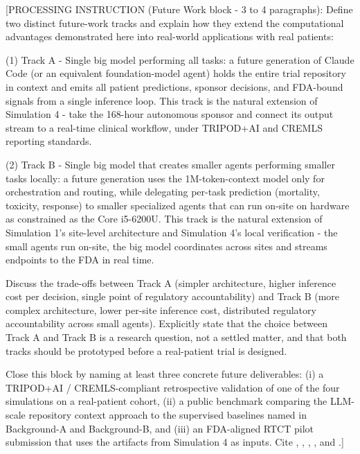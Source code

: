 [PROCESSING INSTRUCTION (Future Work block - 3 to 4 paragraphs): Define
two distinct future-work tracks and explain how they extend the
computational advantages demonstrated here into real-world applications
with real patients:

(1) Track A - Single big model performing all tasks: a future generation
of Claude Code (or an equivalent foundation-model agent) holds the entire
trial repository in context and emits all patient predictions, sponsor
decisions, and FDA-bound signals from a single inference loop. This track
is the natural extension of Simulation 4 - take the 168-hour autonomous
sponsor and connect its output stream to a real-time clinical workflow,
under TRIPOD+AI and CREMLS reporting standards.

(2) Track B - Single big model that creates smaller agents performing
smaller tasks locally: a future generation uses the 1M-token-context
model only for orchestration and routing, while delegating per-task
prediction (mortality, toxicity, response) to smaller specialized agents
that can run on-site on hardware as constrained as the Core i5-6200U.
This track is the natural extension of Simulation 1's site-level
architecture and Simulation 4's local verification - the small agents
run on-site, the big model coordinates across sites and streams
endpoints to the FDA in real time.

Discuss the trade-offs between Track A (simpler architecture, higher
inference cost per decision, single point of regulatory accountability)
and Track B (more complex architecture, lower per-site inference cost,
distributed regulatory accountability across small agents). Explicitly
state that the choice between Track A and Track B is a research question,
not a settled matter, and that both tracks should be prototyped before a
real-patient trial is designed.

Close this block by naming at least three concrete future deliverables:
(i) a TRIPOD+AI / CREMLS-compliant retrospective validation of one of
the four simulations on a real-patient cohort, (ii) a public benchmark
comparing the LLM-scale repository context approach to the supervised
baselines named in Background-A and Background-B, and (iii) an
FDA-aligned RTCT pilot submission that uses the artifacts from
Simulation 4 as inputs. Cite \cite{fda2026realtime},
\cite{Collins2024TRIPODAI}, \cite{ElEmam2024CREMLS},
\cite{kawchak_2026_19119939}, and \cite{kawchak_2026_19396256}.]
